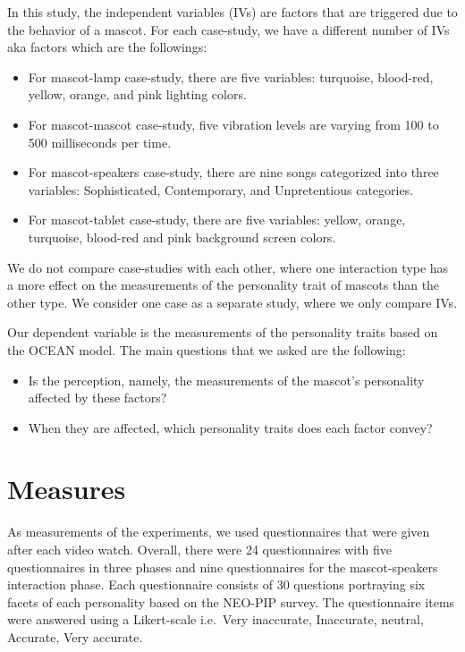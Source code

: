 In this study, the independent variables (IVs) are factors that are triggered due to the behavior of a mascot.
For each case-study, we have a different number of IVs aka factors which are the followings:
\begin{itemize}
  \item For mascot-lamp case-study, there are five variables: turquoise, blood-red,
  yellow, orange, and pink lighting colors.
  \item For mascot-mascot case-study, five vibration levels are varying from 100 to 500 milliseconds per time.
  \item For mascot-speakers case-study, there are nine songs categorized into three variables:
        Sophisticated, Contemporary, and Unpretentious categories.
   \item For mascot-tablet case-study, there are five variables: yellow, orange, turquoise,
        blood-red and pink background screen colors.
\end{itemize}

We do not compare case-studies with each other, where one interaction type
has a more effect on the measurements of the personality trait of mascots than the other type.
We consider one case as a separate study, where we only compare IVs.

Our dependent variable is the measurements of the personality traits based on the OCEAN model.
The main questions that we asked are the following:
\begin{itemize}
  \item Is the perception, namely, the measurements of the mascot’s personality affected by these factors?
  \item When they are affected, which personality traits does each factor convey?
\end{itemize}

\section{Measures}
\label{sec:measures}
As measurements of the experiments, we used questionnaires that were given after each video watch.
Overall, there were 24 questionnaires with five questionnaires in three phases and nine questionnaires
for the mascot-speakers interaction phase.
Each questionnaire consists of 30 questions portraying six facets of each personality based on the NEO-PIP survey.
The questionnaire items were answered using a Likert-scale
i.e.\ Very inaccurate, Inaccurate, neutral, Accurate, Very accurate.



